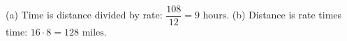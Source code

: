 (a) Time is distance divided by rate: $\dfrac{108}{12}=\boxed{9\text{ hours}}$. (b) Distance is rate times time: $16\cdot8=\boxed{128\text{ miles}}$.
